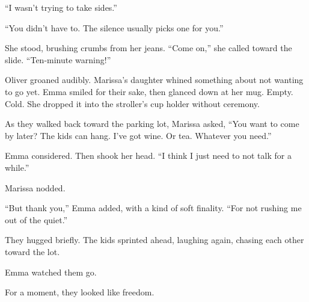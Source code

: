 ``I wasn’t trying to take sides.''

``You didn’t have to. The silence usually picks one for you.''

She stood, brushing crumbs from her jeans. ``Come on,'' she called toward the slide. ``Ten-minute warning!''

Oliver groaned audibly. Marissa’s daughter whined something about not wanting to go yet. Emma smiled for 
their sake, then glanced down at her mug. Empty. Cold. She dropped it into the stroller’s cup holder without ceremony.

As they walked back toward the parking lot, Marissa asked, ``You want to come by later? The kids can hang. 
I’ve got wine. Or tea. Whatever you need.''

Emma considered. Then shook her head. ``I think I just need to not talk for a while.''

Marissa nodded.

``But thank you,'' Emma added, with a kind of soft finality. ``For not rushing me out of the quiet.''

They hugged briefly. The kids sprinted ahead, laughing again, chasing each other toward the lot.

Emma watched them go.

For a moment, they looked like freedom.

